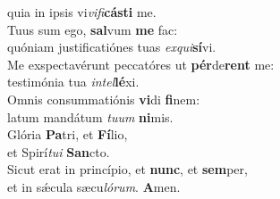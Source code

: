 \oddverse quia in ipsis vi\textit{vi}\textit{fi}\textbf{cá}\textbf{sti} me.\\
\evenverse Tuus sum ego, \textbf{sal}vum \textbf{me} fac:~\*\\
\evenverse quóniam justificatiónes tuas \textit{ex}\textit{qui}\textbf{sí}vi.\\
\oddverse Me exspectavérunt peccatóres ut \textbf{pér}de\textbf{rent} me:~\*\\
\oddverse testimónia tua \textit{in}\textit{tel}\textbf{lé}xi.\\
\evenverse Omnis consummatiónis \textbf{vi}di \textbf{fi}nem:~\*\\
\evenverse latum mandátum \textit{tu}\textit{um} \textbf{ni}mis.\\
\oddverse Glória \textbf{Pa}tri, et \textbf{Fí}lio,~\*\\
\oddverse et Spirí\textit{tu}\textit{i} \textbf{San}cto.\\
\evenverse Sicut erat in princípio, et \textbf{nunc}, et \textbf{sem}per,~\*\\
\evenverse et in sǽcula sæcu\textit{ló}\textit{rum}. \textbf{A}men.\\
